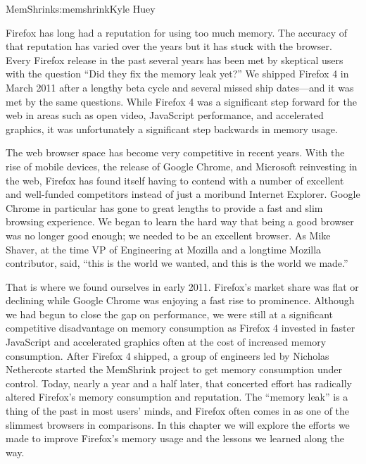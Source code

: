 \begin{aosachapter}{MemShrink}{s:memshrink}{Kyle Huey}


Firefox has long had a reputation for using too much memory. The
accuracy of that reputation has varied over the years but it has stuck
with the browser. Every Firefox release in the past several years has
been met by skeptical users with the question ``Did they fix the memory
leak yet?'' We shipped Firefox 4 in March 2011 after a lengthy beta
cycle and several missed ship dates---and it was met by the same
questions. While Firefox 4 was a significant step forward for the web in
areas such as open video, JavaScript performance, and accelerated
graphics, it was unfortunately a significant step backwards in memory
usage.

The web browser space has become very competitive in recent years. With
the rise of mobile devices, the release of Google Chrome, and Microsoft
reinvesting in the web, Firefox has found itself having to contend with
a number of excellent and well-funded competitors instead of just a
moribund Internet Explorer. Google Chrome in particular has gone to
great lengths to provide a fast and slim browsing experience. We began
to learn the hard way that being a good browser was no longer good
enough; we needed to be an excellent browser. As Mike Shaver, at the
time VP of Engineering at Mozilla and a longtime Mozilla contributor,
said, ``this is the world we wanted, and this is the world we made.''

That is where we found ourselves in early 2011. Firefox's market share
was flat or declining while Google Chrome was enjoying a fast rise to
prominence. Although we had begun to close the gap on performance, we
were still at a significant competitive disadvantage on memory
consumption as Firefox 4 invested in faster JavaScript and accelerated
graphics often at the cost of increased memory consumption. After
Firefox 4 shipped, a group of engineers led by Nicholas Nethercote
started the MemShrink project to get memory consumption under control.
Today, nearly a year and a half later, that concerted effort has
radically altered Firefox's memory consumption and reputation. The
``memory leak'' is a thing of the past in most users' minds, and Firefox
often comes in as one of the slimmest browsers in comparisons. In this
chapter we will explore the efforts we made to improve Firefox's memory
usage and the lessons we learned along the way.



\end{aosachapter}
